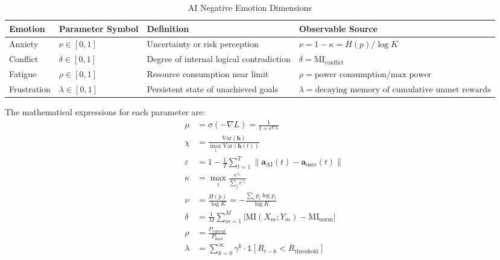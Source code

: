 \documentclass[12pt,a4paper]{article}
\theoremstyle{plain}
\newcommand{\ind}{\mathds{1}}
\begin{document}
\begin{table}[h]
\centering
\caption{AI Negative Emotion Dimensions}
\begin{tabular}{llll}
\toprule
\textbf{Emotion} & \textbf{Parameter Symbol} & \textbf{Definition} & \textbf{Observable Source} \\
\midrule
Anxiety & $\nu \in [0,1]$ & Uncertainty or risk perception & $\nu = 1 - \kappa = H(p)/\log K$ \\
Conflict & $\delta \in [0,1]$ & Degree of internal logical contradiction & $\delta = \text{MI}_{\text{conflict}}$ \\
Fatigue & $\rho \in [0,1]$ & Resource consumption near limit & $\rho = \text{power consumption} / \text{max power}$ \\
Frustration & $\lambda \in [0,1]$ & Persistent state of unachieved goals & $\lambda = \text{decaying memory of cumulative unmet rewards}$ \\
\bottomrule
\end{tabular}
\end{table}

The mathematical expressions for each parameter are:
\begin{align}
\mu &= \sigma(-\nabla L) = \frac{1}{1 + e^{\nabla L}} \label{eq:mu}\\
\chi &= \frac{\text{Var}(\mathbf{h})}{\max_{t} \text{Var}(\mathbf{h}(t))} \label{eq:chi}\\
\varepsilon &= 1 - \frac{1}{T}\sum_{t=1}^T \| \mathbf{a}_{\text{AI}}(t) - \mathbf{a}_{\text{user}}(t) \| \label{eq:eps}\\
\kappa &= \max_i \frac{e^{z_i}}{\sum_j e^{z_j}} \label{eq:kappa}\\
\nu &= \frac{H(p)}{\log K} = -\frac{\sum_i p_i \log p_i}{\log K} \label{eq:nu}\\
\delta &= \frac{1}{M}\sum_{m=1}^M |\text{MI}(X_m; Y_m) - \text{MI}_{\text{norm}}| \label{eq:delta}\\
\rho &= \frac{P_{\text{current}}}{P_{\text{max}}} \label{eq:rho}\\
\lambda &= \sum_{k=0}^{\infty} \gamma^k \cdot \ind[R_{t-k} < R_{\text{threshold}}] \label{eq:lambda}
\end{align}
\end{document}
